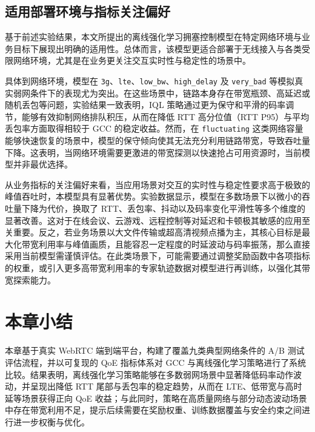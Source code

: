 \subsection{适用部署环境与指标关注偏好}

基于前述实验结果，本文所提出的离线强化学习拥塞控制模型在特定网络环境与业务目标下展现出明确的适用性。总体而言，该模型更适合部署于无线接入与各类受限网络环境，尤其是在业务更关注交互实时性与稳定性的场景中。

具体到网络环境，模型在 \texttt{3g}、\texttt{lte}、\texttt{low\_bw}、\texttt{high\_delay} 及 \texttt{very\_bad} 等模拟真实弱网条件下的表现尤为突出。在这些场景中，链路本身存在带宽瓶颈、高延迟或随机丢包等问题，实验结果一致表明，IQL 策略通过更为保守和平滑的码率调节，能够有效抑制网络排队积压，从而在降低 RTT 高分位值（RTT P95）与平均丢包率方面取得相较于 GCC 的稳定收益。然而，在 \texttt{fluctuating} 这类网络容量能够快速恢复的场景中，模型的保守倾向使其无法充分利用链路带宽，导致吞吐量下降。这表明，当网络环境需要更激进的带宽探测以快速抢占可用资源时，当前模型并非最优选择。

从业务指标的关注偏好来看，当应用场景对交互的实时性与稳定性要求高于极致的峰值吞吐时，本模型具有显著优势。实验数据显示，模型在多数场景下以微小的吞吐量下降为代价，换取了 RTT、丢包率、抖动以及码率变化平滑性等多个维度的显著改善。这对于在线会议、云游戏、远程控制等对延迟和卡顿极其敏感的应用至关重要。反之，若业务场景以大文件传输或超高清视频点播为主，其核心目标是最大化带宽利用率与峰值画质，且能容忍一定程度的时延波动与码率振荡，那么直接采用当前模型需谨慎评估。在此类场景下，可能需要通过调整奖励函数中各项指标的权重，或引入更多高带宽利用率的专家轨迹数据对模型进行再训练，以强化其带宽探索能力。

\section{本章小结}

本章基于真实 WebRTC 端到端平台，构建了覆盖九类典型网络条件的 A/B 测试评估流程，并以可复现的 QoE 指标体系对 GCC 与离线强化学习策略进行了系统比较。结果表明，离线强化学习策略能够在多数弱网场景中显著降低码率动作波动，并呈现出降低 RTT 尾部与丢包率的稳定趋势，从而在 LTE、低带宽与高时延等场景获得正向 QoE 收益；与此同时，策略在高质量网络与部分动态波动场景中存在带宽利用不足，提示后续需要在奖励权重、训练数据覆盖与安全约束之间进行进一步权衡与优化。
